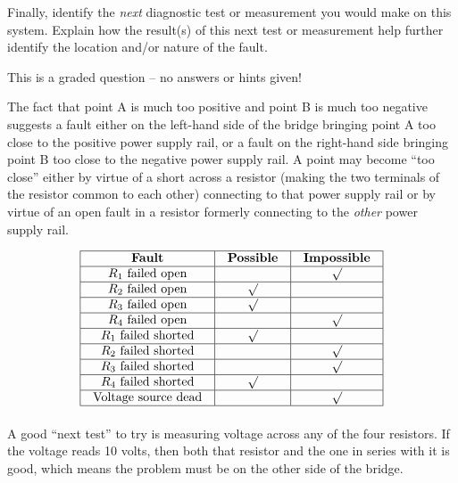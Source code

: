Finally, identify the {\it next} diagnostic test or measurement you would make on this system.  Explain how the result(s) of this next test or measurement help further identify the location and/or nature of the fault.

\vfil 

\eject






This is a graded question -- no answers or hints given!







The fact that point A is much too positive and point B is much too negative suggests a fault either on the left-hand side of the bridge bringing point A too close to the positive power supply rail, or a fault on the right-hand side bringing point B too close to the negative power supply rail.  A point may become ``too close'' either by virtue of a short across a resistor (making the two terminals of the resistor common to each other) connecting to that power supply rail or by virtue of an open fault in a resistor formerly connecting to the {\it other} power supply rail.


$$\vbox{\offinterlineskip
\halign{\strut
\vrule \quad\hfil # \ \hfil & 
\vrule \quad\hfil # \ \hfil & 
\vrule \quad\hfil # \ \hfil \vrule \cr
\noalign{\hrule}
%
{\bf Fault} & {\bf Possible} & {\bf Impossible} \cr
%
\noalign{\hrule}
%
$R_1$ failed open &  & $\surd$ \cr
%
\noalign{\hrule}
%
$R_2$ failed open & $\surd$ &  \cr
%
\noalign{\hrule}
%
$R_3$ failed open & $\surd$ &  \cr
%
\noalign{\hrule}
%
$R_4$ failed open &  & $\surd$ \cr
%
\noalign{\hrule}
%
$R_1$ failed shorted & $\surd$ &  \cr
%
\noalign{\hrule}
%
$R_2$ failed shorted &  & $\surd$ \cr
%
\noalign{\hrule}
%
$R_3$ failed shorted &  & $\surd$ \cr
%
\noalign{\hrule}
%
$R_4$ failed shorted & $\surd$ &  \cr
%
\noalign{\hrule}
%
Voltage source dead &  & $\surd$ \cr
%
\noalign{\hrule}
} %
}$$ %

A good ``next test'' to try is measuring voltage across any of the four resistors.  If the voltage reads 10 volts, then both that resistor and the one in series with it is good, which means the problem must be on the other side of the bridge.

